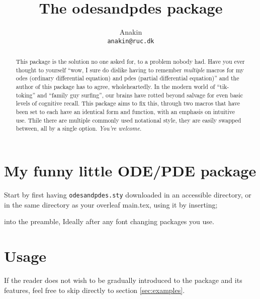 \documentclass[11pt,a4paper]{ltxdoc}
\begin{document}
\author{Anakin\\ \texttt{anakin@ruc.dk}}
\title{The \textsf{odesandpdes} package}

\maketitle

\begin{abstract}
This package is the solution no one asked for, to a problem 
nobody had. Have you ever thought to yourself ``wow, I sure do
dislike having to remember \emph{multiple} macros for my 
odes (ordinary differential equation)
and pdes (partial differential equation)''
and the author of this package has to agree, wholeheartedly.
In the modern world of ``tik-toking'' and ``family guy surfing'', 
our brains have rotted beyond salvage for even basic levels of 
cognitive recall. This package aims to fix this, through two
macros that have been set to each have an identical form and 
function, with an emphasis on intuitive use.
Thile there are multiple commonly used notational
style, they are easily
swapped between, all by a single option.\newline
\emph{You're welcome}.
\end{abstract}




{\setlength{\parskip}{0.25ex}\small
\tableofcontents}



\newpage
\section*{My funny little ODE/PDE package}
\hspace{1em} Start by first having \verb|odesandpdes.sty| downloaded in an
accessible directory, or in the same directory as your 
overleaf main.tex, using it by inserting; 
\begin{center}
\end{center}
into the preamble, Ideally after any font changing packages you use.

\section{Usage}

If the reader does not wish to be gradually introduced to the package
and its features, feel free to skip directly to section \ref{sec:examples}.
\end{document}
